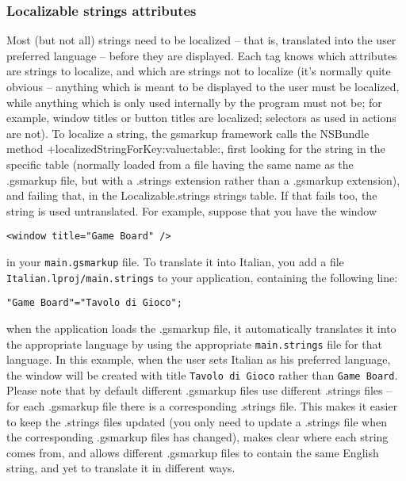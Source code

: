 \subsubsection{Localizable strings attributes}
Most (but not all) strings need to be localized -- that is, translated
into the user preferred language -- before they are displayed.  Each
tag knows which attributes are strings to localize, and which are
strings not to localize (it's normally quite obvious -- anything which
is meant to be displayed to the user must be localized, while anything
which is only used internally by the program must not be; for example,
window titles or button titles are localized; selectors as used in
actions are not).  To localize a string, the gsmarkup framework calls the
NSBundle method +localizedStringForKey:value:table:, first looking for
the string in the specific table (normally loaded from a file having
the same name as the .gsmarkup file, but with a .strings extension rather
than a .gsmarkup extension), and failing that, in the Localizable.strings
strings table.  If that fails too, the string is used untranslated.
For example, suppose that you have the window
\begin{verbatim}
<window title="Game Board" />
\end{verbatim}
in your \texttt{main.gsmarkup} file.  To translate it into Italian, you
add a file \texttt{Italian.lproj/main.strings} to your application,
containing the following line:
\begin{verbatim}
"Game Board"="Tavolo di Gioco";
\end{verbatim}
when the application loads the .gsmarkup file, it automatically translates
it into the appropriate language by using the appropriate
\texttt{main.strings} file for that language.  In this example, when the
user sets Italian as his preferred language, the window will be
created with title \texttt{Tavolo di Gioco} rather than \texttt{Game
Board}.  Please note that by default different .gsmarkup files use
different .strings files -- for each .gsmarkup file there is a
corresponding .strings file.  This makes it easier to keep the
.strings files updated (you only need to update a .strings file when
the corresponding .gsmarkup files has changed), makes clear where each
string comes from, and allows different .gsmarkup files to contain the
same English string, and yet to translate it in different ways.

